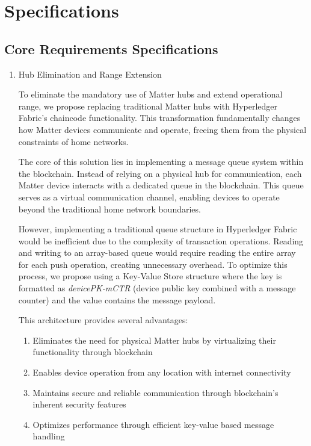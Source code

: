 \documentclass[conference]{IEEEtran}
\begin{document}
\section{Specifications}

\subsection{Core Requirements Specifications}

\begin{enumerate}[itemsep=2ex, parsep=1ex]
	
	\item Hub Elimination and Range Extension
	      
	      To eliminate the mandatory use of Matter hubs and extend operational range, we propose replacing traditional Matter hubs with Hyperledger Fabric's chaincode functionality. This transformation fundamentally changes how Matter devices communicate and operate, freeing them from the physical constraints of home networks.
	      
	      The core of this solution lies in implementing a message queue system within the blockchain. Instead of relying on a physical hub for communication, each Matter device interacts with a dedicated queue in the blockchain. This queue serves as a virtual communication channel, enabling devices to operate beyond the traditional home network boundaries.
	      
	      However, implementing a traditional queue structure in Hyperledger Fabric would be inefficient due to the complexity of transaction operations. Reading and writing to an array-based queue would require reading the entire array for each push operation, creating unnecessary overhead. To optimize this process, we propose using a Key-Value Store structure where the key is formatted as \emph{devicePK-mCTR} (device public key combined with a message counter) and the value contains the message payload.
	      
	      This architecture provides several advantages:
	      \begin{enumerate}[itemsep=2ex, parsep=1ex]
	      	
	      	\item Eliminates the need for physical Matter hubs by virtualizing their functionality through blockchain
	      	\item  Enables device operation from any location with internet connectivity
	      	\item  Maintains secure and reliable communication through blockchain's inherent security features
	      	\item  Optimizes performance through efficient key-value based message handling
	      	      

\end{enumerate}
\end{enumerate}
\end{document}
